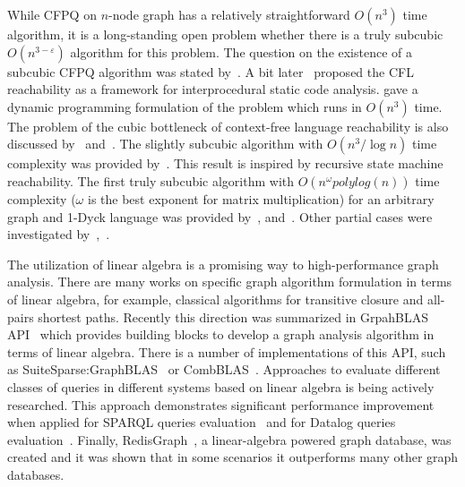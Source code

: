 While CFPQ on $n$-node graph has a relatively straightforward $O(n^3)$ time algorithm, it is a long-standing open problem whether there is a truly  subcubic $O(n^{3-\varepsilon})$ algorithm for this problem.
The question on the existence of a subcubic CFPQ algorithm was stated by~\cite{Yannakakis}.
A bit later~\cite{10.5555/271338.271343} proposed the CFL reachability as a framework for interprocedural static code analysis.
\cite{10.1145/258994.259006} gave a dynamic programming formulation of the problem which runs in $O(n^3)$ time.
The problem of the cubic bottleneck of context-free language reachability is also discussed by~\cite{10.5555/788019.788876} and~\cite{10.1145/258994.259006}.
The slightly subcubic algorithm with $O(n^3/\log{n})$ time complexity was provided by~\cite{10.1145/1328438.1328460}.
This result is inspired by recursive state machine reachability.
The first truly subcubic algorithm with $O(n^\omega polylog(n))$ time complexity ($\omega$ is the best exponent for matrix multiplication) for an arbitrary graph and 1-Dyck language was provided by~\cite{8249039}, and~\cite{pavlogiannis2020finegrained}.
Other partial cases were investigated by~\cite{10.1145/3158118},~\cite{zhang2020conditional}.

The utilization of linear algebra is a promising way to high-performance graph analysis.
There are many works on specific graph algorithm formulation in terms of linear algebra, for example, classical algorithms for transitive closure and all-pairs shortest paths.
Recently this direction was summarized in GrpahBLAS API~\citep{7761646} which provides building blocks to develop a graph analysis algorithm in terms of linear algebra.
There is a number of implementations of this API, such as SuiteSparse:GraphBLAS~\citep{10.1145/3322125} or CombBLAS~\citep{10.1177/1094342011403516}.
Approaches to evaluate different classes of queries in different systems based on linear algebra is being actively researched.
This approach demonstrates significant performance improvement when applied for SPARQL queries evaluation~\citep{10.1145/3302424.3303962,DBLP:journals/corr/MetzlerM15a} and for Datalog queries evaluation~\citep{sato_2017}.
Finally, RedisGraph~\citep{8778293}, a linear-algebra powered graph database, was created and it was shown that in some scenarios it outperforms many other graph databases.